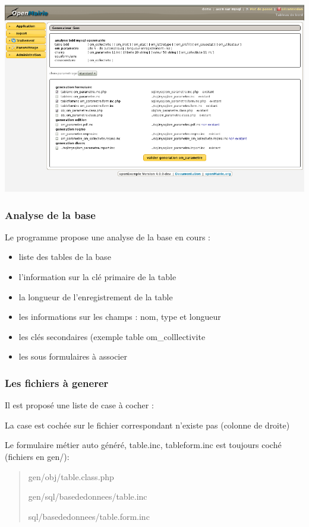 \documentclass[letterpaper,10pt,french]{manual}
\begin{document}
\includegraphics{ecran_2.png}


\subsubsection{Analyse de la base}

Le programme propose une analyse de la base en cours :
\begin{itemize}
\item {} 
liste des tables de la base

\item {} 
l'information sur la clé primaire de la table

\item {} 
la longueur de l'enregistrement de la table

\item {} 
les informations sur les champs : nom, type et longueur

\item {} 
les clés secondaires (exemple table om\_colllectivite

\item {} 
les sous formulaires à associer

\end{itemize}


\subsubsection{Les fichiers à generer}

Il est proposé une liste de case à cocher :

La case est cochée sur le fichier correspondant n'existe pas (colonne de droite)

Le formulaire métier auto généré, table.inc, tableform.inc est toujours coché (fichiers en gen/):
\begin{quote}

gen/obj/table.class.php

gen/sql/basededonnees/table.inc

sql/basededonnees/table.form.inc
\end{quote}
\end{document}
